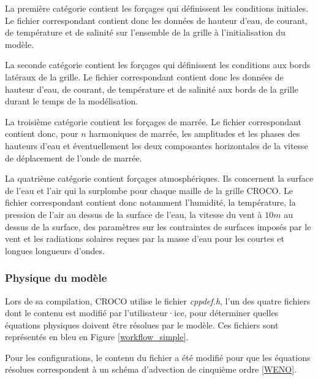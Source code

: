 \documentclass[10pt,a4paper,titlepage]{article}
\begin{document}
La première catégorie contient les forçages qui définissent les conditions initiales.
Le fichier correspondant contient donc les données de hauteur d'eau, de courant, de température et de salinité sur l'ensemble de la grille à l'initialisation du modèle.

La seconde catégorie contient les forçages qui définissent les conditions aux bords latéraux de la grille.
Le fichier correspondant contient donc les données de hauteur d'eau, de courant, de température et de salinité aux bords de la grille durant le temps de la modélisation.

La troisième catégorie contient les forçages de marrée.
Le fichier correspondant contient donc, pour $n$ harmoniques de marrée, les amplitudes et les phases des hauteurs d'eau et éventuellement les deux composantes horizontales de la vitesse de déplacement de l'onde de marrée.

La quatrième catégorie contient forçages atmosphériques.
Ils concernent la surface de l'eau et l'air qui la surplombe pour chaque maille de la grille CROCO.
Le fichier correspondant contient donc notamment l'humidité, la température, la pression de l'air au dessus de la surface de l'eau, la vitesse du vent à $10m$ au dessus de la surface, des paramètres sur les contraintes de surfaces imposés par le vent et les radiations solaires reçues par la masse d'eau pour les courtes et longues longueurs d'ondes.

\subsubsection{Physique du modèle}
Lors de sa compilation, CROCO utilise le fichier \textit{cppdef.h}, l'un des quatre fichiers dont le contenu est modifié par l'utilisateur·ice, pour déterminer quelles équations physiques doivent être résolues par le modèle.
Ces fichiers sont représentés en bleu en Figure \ref{workflow_simple}.

Pour les configurations, le contenu du fichier a été modifié pour que les équations résolues correspondent à un schéma d'advection de cinquième ordre \ref{WENO}.
\end{document}
